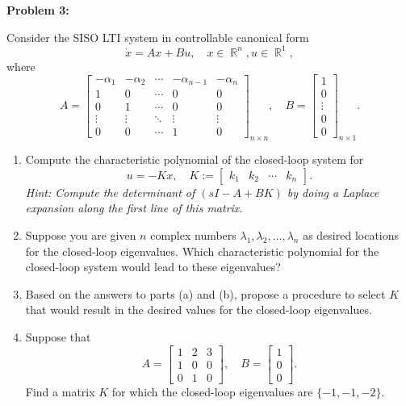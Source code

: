 \documentclass[12pt]{article}
\DeclareMathOperator{\RR}{\mathbb{R}}
\newenvironment{problem}[1]{
    \textbf{Problem #1:}
}{
    \rmfamily \vspace{1em}
}
\begin{document}
\newpage

\begin{problem}{3}
Consider the SISO LTI system in controllable canonical form
\[
    \dot{x} = Ax + Bu, \quad x \in \RR^n, u \in \RR^1,
\]
where
\[
    A = \begin{bmatrix}
        -\alpha_1 & -\alpha_2 & \cdots & -\alpha_{n-1} & -\alpha_n \\
        1 & 0 & \cdots & 0 & 0 \\
        0 & 1 & \cdots & 0 & 0 \\
        \vdots & \vdots & \ddots & \vdots & \vdots \\
        0 & 0 & \cdots & 1 & 0
    \end{bmatrix}_{n\times n},
    \quad
    B = \begin{bmatrix}
        1 \\
        0 \\
        \vdots \\
        0 \\
        0
    \end{bmatrix}_{n\times 1}.
\]

\begin{enumerate}[label=(\alph*)]   
    \item Compute the characteristic polynomial of the closed-loop system for
    \[
        u = -Kx, \quad K := \begin{bmatrix} k_1 & k_2 & \cdots & k_n \end{bmatrix}.
    \]
    \textit{Hint: Compute the determinant of $(sI - A + BK)$ by doing a Laplace expansion along the first line of this matrix.}

    \item Suppose you are given $n$ complex numbers $\lambda_1, \lambda_2, \ldots, \lambda_n$ as desired locations for the closed-loop eigenvalues. Which characteristic polynomial for the closed-loop system would lead to these eigenvalues?

    \item Based on the answers to parts (a) and (b), propose a procedure to select $K$ that would result in the desired values for the closed-loop eigenvalues.
    \item Suppose that
    \[
        A = \begin{bmatrix}
            1 & 2 & 3 \\
            1 & 0 & 0 \\
            0 & 1 & 0
        \end{bmatrix}, \quad
        B = \begin{bmatrix}
            1 \\
            0 \\
            0
        \end{bmatrix}.
    \]
    Find a matrix $K$ for which the closed-loop eigenvalues are $\{-1, -1, -2\}$.
\end{enumerate}
\end{problem}
\end{document}
